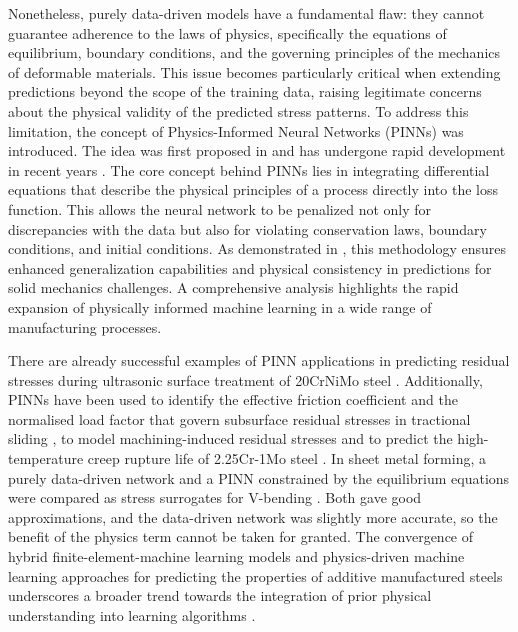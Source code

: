 \documentclass[subscriptcorrection,upint,varvw,barcolor=Goldenrod3,mathalfa=cal=euler,balance,hyphenate,french,pdf-a]{asmejour} %
\begin{document}
Nonetheless, purely data-driven models have a fundamental flaw: they cannot guarantee adherence to the laws of physics, specifically the equations of equilibrium, boundary conditions, and the governing principles of the mechanics of deformable materials. This issue becomes particularly critical when extending predictions beyond the scope of the training data, raising legitimate concerns about the physical validity of the predicted stress patterns.
To address this limitation, the concept of Physics-Informed Neural Networks (PINNs) was introduced. The idea was first proposed in \citep{raissi2019physics} and has undergone rapid development in recent years \citep{karniadakis2021physics}. The core concept behind PINNs lies in integrating differential equations that describe the physical principles of a process directly into the loss function. This allows the neural network to be penalized not only for discrepancies with the data but also for violating conservation laws, boundary conditions, and initial conditions.
As demonstrated in \citep{haghighat2021physics}, this methodology ensures enhanced generalization capabilities and physical consistency in predictions for solid mechanics challenges. A comprehensive analysis \citep{ra2026physics} highlights the rapid expansion of physically informed machine learning in a wide range of manufacturing processes.

There are already successful examples of PINN applications in predicting residual stresses during ultrasonic surface treatment of 20CrNiMo steel \citep{yang2025prediction}. Additionally, PINNs have been used to identify the effective friction coefficient and the normalised load factor that govern subsurface residual stresses in tractional sliding \citep{mehedihasan2026inverse}, to model machining-induced residual stresses \citep{hasan2025machining} and to predict the high-temperature creep rupture life of 2.25Cr-1Mo steel \citep{muransky2026application}. In sheet metal forming, a purely data-driven network and a PINN constrained by the equilibrium equations were compared as stress surrogates for V-bending \citep{munzone2024comparative}. Both gave good approximations, and the data-driven network was slightly more accurate, so the benefit of the physics term cannot be taken for granted. The convergence of hybrid finite-element-machine learning models and physics-driven machine learning approaches for predicting the properties of additive manufactured steels underscores a broader trend towards the integration of prior physical understanding into learning algorithms \citep{laakso2024hybrid, rahman2025physics}.
\end{document}
